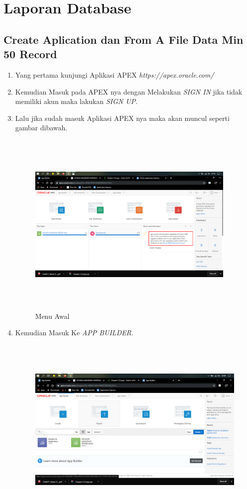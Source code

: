 \chapter{Laporan Database}
\section{Create Aplication dan From A File Data Min 50 Record}
\par
\begin{enumerate}
    \item Yang pertama kunjungi Aplikasi APEX \textit{https://apex.oracle.com/} 
    \item Kemudian Masuk pada APEX nya dengan Melakukan \textit{SIGN IN} jika tidak memiliki akun maka lakukan \textit{SIGN UP}.
    \item Lalu jika sudah masuk Aplikasi APEX nya maka akan muncul seperti gambar dibawah.
    \begin{figure}[!htbp]
\centering
\includegraphics[width=10cm,height=9cm]{figures/1.PNG}
\caption{Menu Awal}
\label{penanda}
\end{figure}
    \item Kemudian Masuk Ke \textit{APP BUILDER}.
\begin{figure}[!htbp]
\centering
\includegraphics[width=11cm,height=9cm]{figures/2.PNG}

\end{figure}
\end{enumerate}
